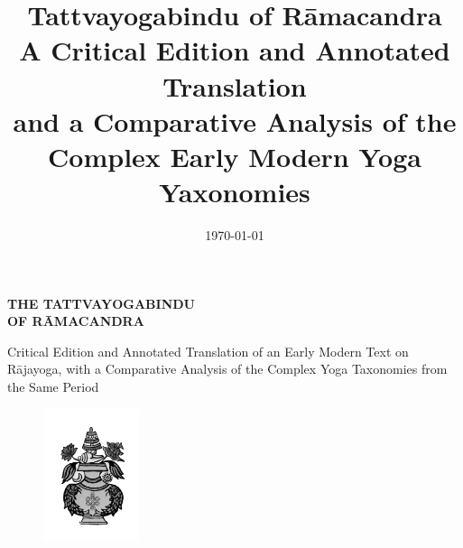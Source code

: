 

\title{Tattvayogabindu of Rāmacandra\\ A Critical Edition and Annotated Translation\\ and a Comparative Analysis of the \\Complex Early Modern Yoga Yaxonomies }
\date{\today}
\parindent=15pt



\frontmatter
\thispagestyle{empty} %
\begin{center}



\vspace{0.25in}


\huge\textbf{\MakeUppercase{The Tattvayogabindu \\of Rāmacandra}}\\

\vspace{0.2in}

\Large  Critical Edition and Annotated Translation of an Early Modern Text on Rājayoga, with a Comparative Analysis of the Complex Yoga Taxonomies from the Same Period\\ 

\vspace{0.45in}

\thispagestyle{empty}
\end{center}

\newpage

  \thispagestyle{empty}
  \begin{figure}[p]
    \centering
    \includegraphics[width=0.25\textwidth]{pics/purna.jpg}
  \end{figure}
  
